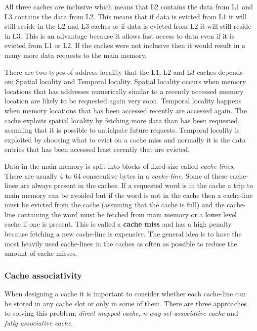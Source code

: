 All three caches are inclusive which means that L2 contains the data from L1 and L3 contains the data from L2.
This means that if data is evicted from L1 it will still reside in the L2 and L3 caches or if data is evicted from L2 it will still reside in L3. 
This is an advantage because it allows fast access to data even if it is evicted from L1 or L2. 
If the caches were not inclusive then it would result in a many more data requests to the main memory.

There are two types of address locality that the L1, L2 and L3 caches depends on; Spatial locality and Temporal locality.
Spatial locality occurs when memory locations that has addresses numerically similar to a recently accessed memory location are likely to be requested again very soon.
Temporal locality happens when memory locations that has been accessed recently are accessed again.
The cache exploits spatial locality by fetching more data than has been requested, assuming that it is possible to anticipate future requests.
Temporal locality is exploited by choosing what to evict on a cache miss and normally it is the data entries that has been accessed least recently that are evicted.

Data in the main memory is split into blocks of fixed size called \textit{cache-lines}. 
There are usually 4 to 64 consecutive bytes in a \textit{cache-line}. 
Some of these cache-lines are always present in the caches. 
If a requested word is in the cache a trip to main memory can be avoided but if the word is not in the cache then a cache-line must be evicted from the cache (assuming that the cache is full) and the cache-line containing the word must be fetched from main memory or a lower level cache if one is present. 
This is called a \textbf{cache miss} and has a high penalty because fetching a new cache-line is expensive.
The general idea is to have the most heavily used cache-lines in the caches as often as possible to reduce the amount of cache misses.

\subsubsection{Cache associativity}
When designing a cache it is important to consider whether each cache-line can be stored in any cache slot or only in some of them.
There are three approaches to solving this problem; \textit{direct mapped cache}, \textit{n-way set-associative cache} and \textit{fully associative cache}. 

